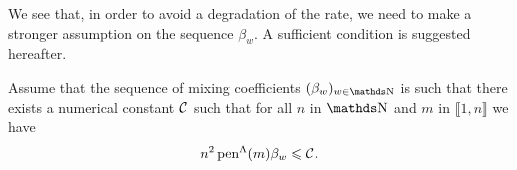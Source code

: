 %
%
%
%

We see that, in order to avoid a degradation of the rate, we need to make a stronger assumption on the sequence $\beta_{w}$.
A sufficient condition is suggested hereafter.

\begin{as}\label{freq:circ:kn:beta:as}
Assume that the sequence of mixing coefficients $(\beta_{w})_{w \in \N}$ is such that there exists a numerical constant ${\mathcal C}^{}_{}$ such that for all $n$ in $\N$ and $m$ in $\llbracket 1, n \rrbracket$ we have
\[n^{2} \operatorname{pen}^{\Lambda}(m) \beta_{w} \leqslant {\mathcal C}^{}_{}.\]
\assEnd
\end{as}


